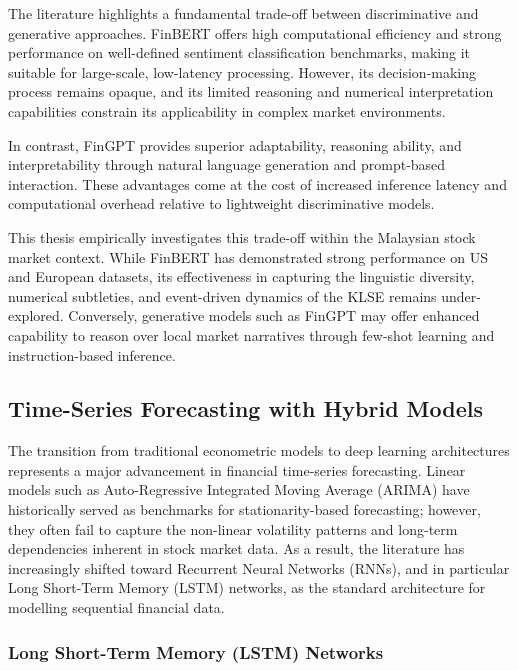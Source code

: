 \documentclass[singlespace]{ucetd}
\begin{document}
The literature highlights a fundamental trade-off between discriminative and generative approaches. FinBERT offers high computational efficiency and strong performance on well-defined sentiment classification benchmarks, making it suitable for large-scale, low-latency processing. However, its decision-making process remains opaque, and its limited reasoning and numerical interpretation capabilities constrain its applicability in complex market environments.

In contrast, FinGPT provides superior adaptability, reasoning ability, and interpretability through natural language generation and prompt-based interaction. These advantages come at the cost of increased inference latency and computational overhead relative to lightweight discriminative models. 

This thesis empirically investigates this trade-off within the Malaysian stock market context. While FinBERT has demonstrated strong performance on US and European datasets, its effectiveness in capturing the linguistic diversity, numerical subtleties, and event-driven dynamics of the KLSE remains under-explored. Conversely, generative models such as FinGPT may offer enhanced capability to reason over local market narratives through few-shot learning and instruction-based inference.



\subsection{Time-Series Forecasting with Hybrid Models}

The transition from traditional econometric models to deep learning architectures represents a major advancement in financial time-series forecasting. Linear models such as Auto-Regressive Integrated Moving Average (ARIMA) have historically served as benchmarks for stationarity-based forecasting; however, they often fail to capture the non-linear volatility patterns and long-term dependencies inherent in stock market data. As a result, the literature has increasingly shifted toward Recurrent Neural Networks (RNNs), and in particular Long Short-Term Memory (LSTM) networks, as the standard architecture for modelling sequential financial data.

\subsubsection{Long Short-Term Memory (LSTM) Networks}
\end{document}
